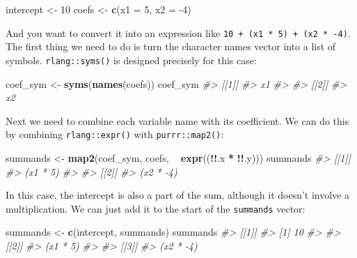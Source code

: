 \documentclass[]{book}
\newenvironment{Shaded}{\begin{snugshade}}{\end{snugshade}}
\newcommand{\CommentTok}[1]{\textcolor[rgb]{0.37,0.37,0.37}{\textit{#1}}}
\newcommand{\DataTypeTok}[1]{\textcolor[rgb]{0.27,0.27,0.27}{#1}}
\newcommand{\DecValTok}[1]{\textcolor[rgb]{0.06,0.06,0.06}{#1}}
\newcommand{\KeywordTok}[1]{\textcolor[rgb]{0.27,0.27,0.27}{\textbf{#1}}}
\newcommand{\NormalTok}[1]{#1}
\newcommand{\OperatorTok}[1]{\textcolor[rgb]{0.43,0.43,0.43}{\textbf{#1}}}
\newcommand{\StringTok}[1]{\textcolor[rgb]{0.5,0.5,0.5}{#1}}
\begin{document}
\begin{Shaded}
\begin{Highlighting}[]
\NormalTok{intercept <-}\StringTok{ }\DecValTok{10}
\NormalTok{coefs <-}\StringTok{ }\KeywordTok{c}\NormalTok{(}\DataTypeTok{x1 =} \DecValTok{5}\NormalTok{, }\DataTypeTok{x2 =} \DecValTok{-4}\NormalTok{)}
\end{Highlighting}
\end{Shaded}

And you want to convert it into an expression like \texttt{10\ +\ (x1\ *\ 5)\ +\ (x2\ *\ -4)}. The first thing we need to do is turn the character names vector into a list of symbols. \texttt{rlang::syms()} is designed precisely for this case:

\begin{Shaded}
\begin{Highlighting}[]
\NormalTok{coef_sym <-}\StringTok{ }\KeywordTok{syms}\NormalTok{(}\KeywordTok{names}\NormalTok{(coefs))}
\NormalTok{coef_sym}
\CommentTok{#> [[1]]}
\CommentTok{#> x1}
\CommentTok{#> }
\CommentTok{#> [[2]]}
\CommentTok{#> x2}
\end{Highlighting}
\end{Shaded}

Next we need to combine each variable name with its coefficient. We can do this by combining \texttt{rlang::expr()} with \texttt{purrr::map2()}:

\begin{Shaded}
\begin{Highlighting}[]
\NormalTok{summands <-}\StringTok{ }\KeywordTok{map2}\NormalTok{(coef_sym, coefs, }\OperatorTok{~}\StringTok{ }\KeywordTok{expr}\NormalTok{((}\OperatorTok{!!}\NormalTok{.x }\OperatorTok{*}\StringTok{ }\OperatorTok{!!}\NormalTok{.y)))}
\NormalTok{summands}
\CommentTok{#> [[1]]}
\CommentTok{#> (x1 * 5)}
\CommentTok{#> }
\CommentTok{#> [[2]]}
\CommentTok{#> (x2 * -4)}
\end{Highlighting}
\end{Shaded}

In this case, the intercept is also a part of the sum, although it doesn't involve a multiplication. We can just add it to the start of the \texttt{summands} vector:

\begin{Shaded}
\begin{Highlighting}[]
\NormalTok{summands <-}\StringTok{ }\KeywordTok{c}\NormalTok{(intercept, summands)}
\NormalTok{summands}
\CommentTok{#> [[1]]}
\CommentTok{#> [1] 10}
\CommentTok{#> }
\CommentTok{#> [[2]]}
\CommentTok{#> (x1 * 5)}
\CommentTok{#> }
\CommentTok{#> [[3]]}
\CommentTok{#> (x2 * -4)}
\end{Highlighting}
\end{Shaded}
\end{document}

